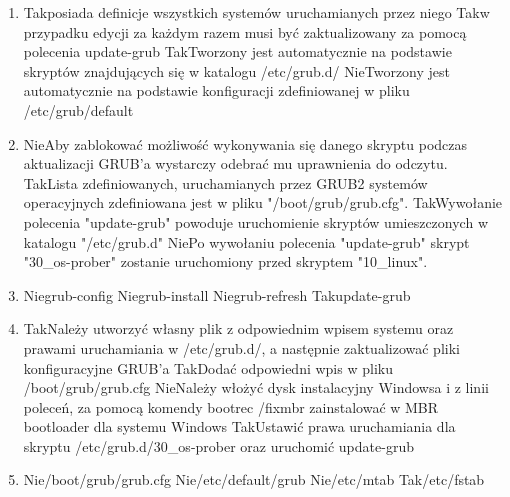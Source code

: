 \begin{enumerate}
	\item {}
	{Tak}{posiada definicje wszystkich systemów uruchamianych przez niego}
	{Tak}{w przypadku edycji za każdym razem musi być zaktualizowany za pomocą polecenia update-grub}
	{Tak}{Tworzony jest automatycznie na podstawie skryptów znajdujących się w katalogu /etc/grub.d/}
	{Nie}{Tworzony jest automatycznie na podstawie konfiguracji zdefiniowanej w pliku /etc/grub/default}
	
	\newpage

	\item {}
	{Nie}{Aby zablokować możliwość wykonywania się danego skryptu podczas aktualizacji GRUB'a wystarczy odebrać mu uprawnienia do odczytu.}
	{Tak}{Lista zdefiniowanych, uruchamianych przez GRUB2 systemów operacyjnych zdefiniowana jest w pliku "/boot/grub/grub.cfg".}
	{Tak}{Wywołanie polecenia "update-grub" powoduje uruchomienie skryptów umieszczonych w katalogu "/etc/grub.d"}
	{Nie}{Po wywołaniu polecenia "update-grub" skrypt "30\_os-prober" zostanie uruchomiony przed skryptem "10\_linux".}
	
	\item {}
	{Nie}{grub-config}
	{Nie}{grub-install}
	{Nie}{grub-refresh}
	{Tak}{update-grub}
	
	\item {}
	{Tak}{Należy utworzyć własny plik z odpowiednim wpisem systemu oraz prawami uruchamiania w /etc/grub.d/, a następnie zaktualizować pliki konfiguracyjne GRUB'a}
	{Tak}{Dodać odpowiedni wpis w pliku /boot/grub/grub.cfg}
	{Nie}{Należy włożyć dysk instalacyjny Windowsa i z linii poleceń, za pomocą komendy bootrec /fixmbr zainstalować w MBR bootloader dla systemu Windows}
	{Tak}{Ustawić prawa uruchamiania dla skryptu /etc/grub.d/30\_os-prober oraz uruchomić update-grub}

	\item {}
	{Nie}{/boot/grub/grub.cfg}
	{Nie}{/etc/default/grub}
	{Nie}{/etc/mtab}
	{Tak}{/etc/fstab}
	

\end{enumerate}
